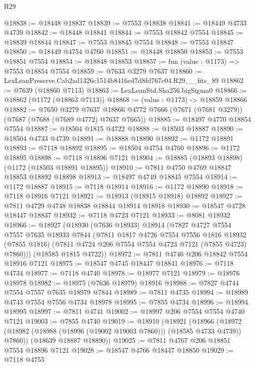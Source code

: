 \begin{lexlean}{R29}
\begin{coremodule}
@18838 := @18448 @18837
@18839 := @7553 @18838
@18841 := @18449 @4733 @4739
@18842 := @18448 @18841
@18844 := @7553 @18842 @7554
@18845 := @18839 @18844
@18847 := @7553 @18845 @7554
@18848 := @7553 @18847
@18850 := @18449 @4754 @4760
@18851 := @18448 @18850
@18853 := @7553 @18851 @7554
@18854 := @18848 @18853
@18857 := fun (value : @1173) => @7553 @18854 @7554
@18859 := @7633 @3279 @7637
@18860 := LexLeanPreserve.Cab2ad1326c1514b8416cd7d8fd767c04.R29.__fits_89
@18862 := @7639 (@18860 @7113)
@18863 := LexLeanStd.Sha256.bigSigma0
@18866 := @18862 (@1172 (@18863 @7113))
@18868 := (value : @1173) -> @18859 @18866
@18882 := @7650
    @3279
    @7637
    @18866
    @4772
    @7666
    (@7671 (@7681 @3279))
    (@7687 (@7688 (@7689 @4772) @7637 @7665))
@18885 := @18497 @4770 @18854 @7554
@18887 := @18504 @1815 @4722
@18888 := @18503 @18887
@18890 := @18504 @4733 @4739
@18891 := @18888 @18890
@18892 := @1172 @18891
@18893 := @7118 @18892
@18895 := @18504 @4754 @4760
@18896 := @1172 @18895
@18898 := @7118 @18896 @7121
@18904 := @18885 (@18893 @18898) (@1172 (@18503 @18891 @18895))
@18910 := @7811 @4750 @4769 @18847 @18853 @18892 @18898
@18913 := @18497 @4749 @18845 @7554
@18914 := @1172 @18887
@18915 := @7118 @18914
@18916 := @1172 @18890
@18918 := @7118 @18916 @7121
@18921 := @18913 (@18915 @18918) @18892
@18927 := @7811 @4729 @4748 @18838 @18844 @18914 @18918
@18930 := @18547 @4728 @18447 @18837
@18932 := @7118 @4723 @7121
@18933 := @8081 @18932
@18966 := @18927
    (@18930
      (@7636 @18933)
      @18914
      (@7827
        @4727
        @7554
        @7557
        @7635
        @18933
        @7844
        (@7811
          @1817
          @4726
          @7554
          @7556
          @1816
          @18932
          (@7855 @1816)
          (@7811 @4724 @206 @7554 @7554 @4723 @7121 (@7855 @4723) @7860)))
      (@18585 @1815 @4722))
@18972 := @7811 @4746 @206 @18842 @7554 @18916 @7121
@18975 := @18547 @4745 @18447 @18841
@18976 := @7118 @4734
@18977 := @7118 @4740
@18978 := @18977 @7121
@18979 := @18976 @18978
@18982 := @18975 (@7636 @18979) @18916
@18988 := @7827 @4744 @7554 @7557 @7635 @18979 @7844
@18989 := @7811 @4735
@18994 := @18989 @4743 @7554 @7556 @4734 @18978
@18995 := @7855 @4734
@18996 := @18994 @18995
@18997 := @7811 @4741
@19002 := @18997 @206 @7554 @7554 @4740 @7121
@19003 := @7855 @4740
@19019 := @18910
    (@18921
      (@18966 (@18972 (@18982 (@18988 (@18996 (@19002 @19003 @7860))) (@18585 @4733 @4739)) @7860))
      (@18639 @18887 @18890))
@19025 := @7811 @4767 @206 @18851 @7554 @18896 @7121
@19028 := @18547 @4766 @18447 @18850
@19029 := @7118 @4755

\end{coremodule}
\end{lexlean}

